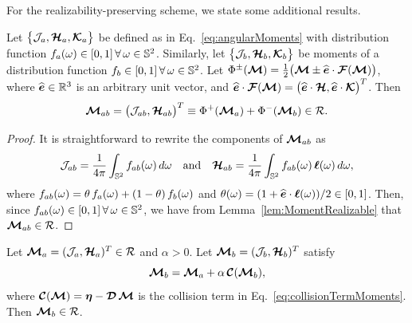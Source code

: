 For the realizability-preserving scheme, we state some additional results.  
\begin{lemma}
  Let $\big\{\mathcal{J}_{a},\boldsymbol{\mathcal{H}}_{a},\boldsymbol{\mathcal{K}}_{a}\big\}$ be defined as in Eq.~\eqref{eq:angularMoments} with distribution function $f_{a}(\omega)\in[0,1]\,\forall\,\omega\in\mathbb{S}^{2}$.  
  Similarly, let $\big\{\mathcal{J}_{b},\boldsymbol{\mathcal{H}}_{b},\boldsymbol{\mathcal{K}}_{b}\big\}$ be moments of a distribution function $f_{b}\in[0,1]\,\forall\,\omega\in\mathbb{S}^{2}$.  
  Let $\Phi^{\pm}(\boldsymbol{\mathcal{M}})=\frac{1}{2}\big(\boldsymbol{\mathcal{M}}\pm\widehat{\boldsymbol{e}}\cdot\boldsymbol{\mathcal{F}}(\boldsymbol{\mathcal{M}})\big)$, where $\widehat{\boldsymbol{e}}\in\mathbb{R}^{3}$ is an arbitrary unit vector, and $\widehat{\boldsymbol{e}}\cdot\boldsymbol{\mathcal{F}}(\boldsymbol{\mathcal{M}})=\big(\widehat{\boldsymbol{e}}\cdot\boldsymbol{\mathcal{H}},\widehat{\boldsymbol{e}}\cdot\boldsymbol{\mathcal{K}}\big)^{T}$.  
  Then
  \begin{equation*}
    \boldsymbol{\mathcal{M}}_{ab} = \big(\mathcal{J}_{ab},\boldsymbol{\mathcal{H}}_{ab}\big)^{T} \equiv \Phi^{+}(\boldsymbol{\mathcal{M}}_{a})+\Phi^{-}(\boldsymbol{\mathcal{M}}_{b})\in\mathcal{R}.
  \end{equation*}
\end{lemma}
\begin{proof}
  It is straightforward to rewrite the components of $\boldsymbol{\mathcal{M}}_{ab}$ as
  \begin{equation*}
    \mathcal{J}_{ab}=\frac{1}{4\pi}\int_{\mathbb{S}^{2}}f_{ab}(\omega)\,d\omega
    \quad\text{and}\quad
    \boldsymbol{\mathcal{H}}_{ab}=\frac{1}{4\pi}\int_{\mathbb{S}^{2}}f_{ab}(\omega)\,\boldsymbol{\ell}(\omega)\,d\omega,
  \end{equation*}
  where $f_{ab}(\omega)=\theta\,f_{a}(\omega)+(1-\theta)\,f_{b}(\omega)$ and $\theta(\omega)=(1+\widehat{\boldsymbol{e}}\cdot\boldsymbol{\ell}(\omega))/2\in[0,1]$.  
  Then, since $f_{ab}(\omega)\in[0,1]\,\forall\,\omega\in\mathbb{S}^{2}$, we have from Lemma~\ref{lem:MomentRealizable} that $\boldsymbol{\mathcal{M}}_{ab}\in\mathcal{R}$.  
\end{proof}

\begin{lemma}
  Let $\boldsymbol{\mathcal{M}}_{a}=(\mathcal{J}_{a},\boldsymbol{\mathcal{H}}_{a})^{T}\in\mathcal{R}$ and $\alpha>0$.  
  Let $\boldsymbol{\mathcal{M}}_{b}=(\mathcal{J}_{b},\boldsymbol{\mathcal{H}}_{b})^{T}$ satisfy
  \begin{equation*}
    \boldsymbol{\mathcal{M}}_{b}=\boldsymbol{\mathcal{M}}_{a}+\alpha\,\boldsymbol{\mathcal{C}}(\boldsymbol{\mathcal{M}}_{b}), 
  \end{equation*}
  where $\boldsymbol{\mathcal{C}}(\boldsymbol{\mathcal{M}})=\boldsymbol{\eta}-\boldsymbol{\mathcal{D}}\,\boldsymbol{\mathcal{M}}$ is the collision term in Eq.~\eqref{eq:collisionTermMoments}.  
  Then $\boldsymbol{\mathcal{M}}_{b}\in\mathcal{R}$.  
  \label{lem:implicitStep}
\end{lemma}

